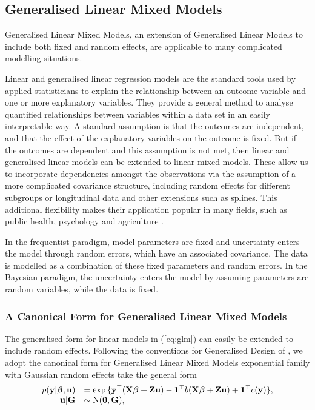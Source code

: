 \subsection{Generalised Linear Mixed Models}

Generalised Linear Mixed Models, an extension of Generalised Linear Models to
include both fixed and random effects, are applicable to many complicated
modelling situations.

Linear and generalised linear regression models are the standard tools used by
applied statisticians to explain the relationship between an outcome variable
and one or more explanatory variables. They provide a general method  to analyse
quantified relationships between variables within a data set in an easily
interpretable way. A standard assumption is that the outcomes are independent,
and that the effect of the explanatory variables on the outcome is fixed. But if
the outcomes are dependent and this assumption is not met, then linear and
generalised linear models can be extended to linear mixed models. These allow us
to incorporate dependencies amongst the  observations via the assumption of a
more complicated covariance structure, including random effects for  different
subgroups or longitudinal data and other extensions such as splines. This
additional flexibility makes their application popular in many fields, such as
public health, psychology and agriculture \citep{Kleinman2004, Lo2015, Kachman2000}.

In the frequentist paradigm, model parameters are fixed and uncertainty enters
the model through random errors, which have an associated covariance. The data
is modelled as a combination of these fixed parameters and random errors. In the
Bayesian paradigm, the uncertainty enters the model by assuming parameters are
random variables, while the data is fixed.

\subsubsection{A Canonical Form for Generalised Linear Mixed Models}

The generalised form for linear models in  (\ref{eq:glm}) can easily be
extended to include random effects.  Following the conventions for Generalised
Design of \cite{Zhao2006}, we adopt the canonical form for Generalised Linear
Mixed Models exponential family with Gaussian random effects take the general
form
$$
\begin{array}{rl}\label{eq:glmm}
	p({\bf y} | {\boldsymbol \beta}, {\bf u}) &= \exp{\{ {\bf y}^\top ({\bf X}{\boldsymbol\beta}+ {\bf Z}{\bf u}) - {\bf1}^\top b({\bf X}{\boldsymbol\beta}+ {\bf Z}{\bf u}) + {\bf1}^\top c({\bf y}) \}}, \\
	{\bf u} | {\bf G} &\sim \text{N}({\bf 0}, {\bf G}),
\end{array}
$$

